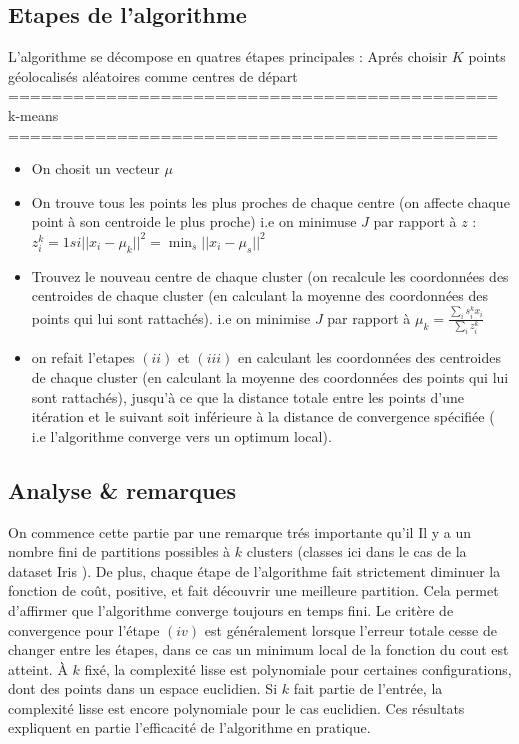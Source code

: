 \documentclass[12pt]{article}
\numberwithin{equation}{section}
\theoremstyle{plain}
\def\v1{\vskip0.2cm}
\def\no{\noindent}
\def\m{\mu}
\def\iti{\item[$(i)$]}
\def\itii{\item[$(ii)$]}
\def\itiii{\item[$(iii)$]}
\def\itiv{\item[$(iv)$]}
\def\no{\noindent}
\begin{document}
\subsection{Etapes de l'algorithme}
L'algorithme se décompose en quatres étapes principales : Aprés  
choisir $K$ points géolocalisés aléatoires comme centres de départ 
\v1\no
=============================================\\
k-means \\
=============================================
\begin{itemize}
\iti On chosit un vecteur $\mu$
\itii On trouve tous les points les plus proches de chaque centre (on affecte chaque point à son centroide le plus proche) i.e on minimuse $J$ par rapport à $z$ :  $z_i^k =1 si ||x_i - \mu_k ||^2 = \min_s ||x_i -\mu _s ||^2$
\itiii Trouvez le nouveau centre de chaque cluster (on recalcule les coordonnées des centroides de chaque cluster (en calculant la moyenne des coordonnées des points qui lui sont rattachés). i.e  on minimise $J$ par rapport à $\m_k =\frac{\sum_i s_i^k x_i} {\sum_i z_i^k}$ 
\itiv on refait l'etapes $(ii)$ et $(iii)$ en calculant les coordonnées des centroides de chaque cluster (en calculant
la moyenne des coordonnées des points qui lui sont rattachés), jusqu'à ce que la distance totale entre les points d'une itération et le suivant soit inférieure à la distance de convergence spécifiée ( i.e l'algorithme converge vers un optimum local).
\end{itemize}
\subsection{Analyse \& remarques}

On commence cette partie par une remarque trés importante qu'il Il y a un nombre fini de partitions possibles à $k$ clusters (classes ici dans le cas de la dataset Iris ). De plus, chaque étape de l'algorithme fait strictement diminuer la fonction de coût, positive, et fait découvrir une meilleure partition. Cela permet d'affirmer que l'algorithme converge toujours en temps fini.\v1 
Le critère de convergence pour l'étape $(iv)$ est généralement lorsque l'erreur totale cesse de changer entre les étapes, dans ce cas un minimum local de la fonction du cout est atteint. À $k$ fixé, la complexité lisse est polynomiale pour certaines configurations, dont des points dans un espace euclidien. Si $k$ fait partie de l'entrée, la complexité lisse est encore polynomiale pour le cas euclidien. Ces résultats expliquent en partie l'efficacité de l'algorithme en pratique.
\end{document}
